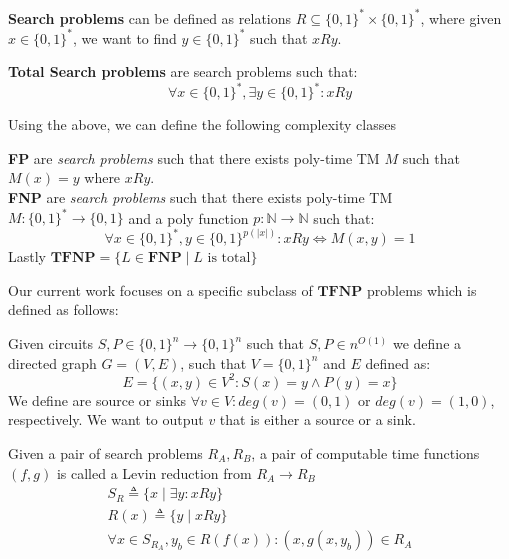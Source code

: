 \begin{definition}
    \textbf{Search problems} can be defined as relations $R \subseteq \{0,1\}^* \times \{0,1\}^*$,
    where given $x \in \{0,1\}^*$, we want to find $y \in \{0,1\}^*$  such that $x Ry$.

    \textbf{Total Search problems} are search problems such that:
    $$
    \forall x \in \{0,1\}^*, \exists y \in \{0,1\}^* : xRy
    $$
\end{definition}

Using the above, we can define the following complexity classes

\begin{definition}
    \textbf{FP} are \textit{search problems} such that there exists poly-time TM $M$
    such that $M(x) = y$ where $x Ry$.\\
    \textbf{FNP} are \textit{search problems} such that there exists poly-time TM $M: \{0,1\}^* \to \{0,1\}$
    and a poly function $p : \mathbb{N} \to \mathbb{N}$ such that:
    $$
    \forall x \in \{0,1\}^*, y \in \{0,1\}^{p(|x|)}: xRy \iff M(x,y) = 1
    $$
    Lastly $\textbf{TFNP} = \{L \in \textbf{FNP} \mid L \text{ is total}\}$
\end{definition}

Our current work focuses on a specific subclass of $\textbf{TFNP}$ problems
which is defined as follows:

\begin{definition}
    Given circuits $S, P \in \{0,1\}^n \to \{0,1\}^n$ such that $S,P \in n^{O(1)}$
    we define a directed graph $G = (V,E)$, such that $V= \{0,1\}^n$ and $E$ defined as:
    $$
    E = \{(x,y) \in V^2: S(x) = y \wedge P(y) = x\}
    $$
    We define are source or sinks $\forall v \in V: \textit{deg}(v) = (0,1)$ or
    $\textit{deg}(v) = (1,0)$, respectively. We want to output
    $v$ that is either a source or a sink.
\end{definition}


\begin{definition}
    Given a pair of search problems $R_A, R_B$, a pair of
    computable time functions $(f,g)$ is called a Levin reduction from $R_A \to R_B$
    \begin{gather*}
        S_R \triangleq \{x \mid \exists y : xRy  \}\\
        R(x) \triangleq \{y \mid x Ry \} \\
        \forall x \in S_{R_A}, y_b \in R(f(x)):  (x , g(x, y_b)) \in R_A
    \end{gather*}
\end{definition}

